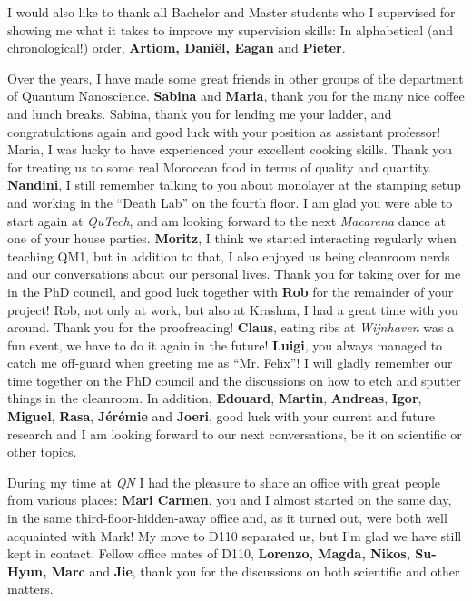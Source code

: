 I would also like to thank all Bachelor and Master students who I supervised for showing me what it takes to improve my supervision skills:
%
In alphabetical (and chronological!) order, \textbf{Artiom, Daniël, Eagan} and \textbf{Pieter}.

Over the years, I have made some great friends in other groups of the department of Quantum Nanoscience.
%
\textbf{Sabina} and \textbf{Maria}, thank you for the many nice coffee and lunch breaks.
%
Sabina, thank you for lending me your ladder, and congratulations again and good luck with your position as assistant professor!
%
Maria, I was lucky to have experienced your excellent cooking skills. 
%
Thank you for treating us to some real Moroccan food in terms of quality and quantity.
%
\textbf{Nandini}, I still remember talking to you about monolayer  at the stamping setup and working in the \enquote{Death Lab} on the fourth floor.
%
I am glad you were able to start again at \textit{QuTech}, and am looking forward to the next \textit{Macarena} dance at one of your house parties.
%
\textbf{Moritz}, I think we started interacting regularly when teaching QM1, but in addition to that, I also enjoyed us being cleanroom nerds and our conversations about our personal lives.
%
Thank you for taking over for me in the PhD council, and good luck together with \textbf{Rob} for the remainder of your project!
%
Rob, not only at work, but also at Krashna, I had a great time with you around.
%
Thank you for the proofreading!
%
\textbf{Claus}, eating ribs at \textit{Wijnhaven} was a fun event, we have to do it again in the future!
%
\textbf{Luigi}, you always managed to catch me off-guard when greeting me as \enquote{Mr. Felix}!
%
I will gladly remember our time together on the PhD council and the discussions on how to etch and sputter things in the cleanroom.
%
In addition, \textbf{Edouard}, \textbf{Martin}, \textbf{Andreas}, \textbf{Igor}, \textbf{Miguel}, \textbf{Rasa}, \textbf{Jérémie} and \textbf{Joeri}, good luck with your current and future research and I am looking forward to our next conversations, be it on scientific or other topics.

During my time at \textit{QN} I had the pleasure to share an office with great people from various places:
%
\textbf{Mari Carmen}, you and I almost started on the same day, in the same third-floor-hidden-away office and, as it turned out, were both well acquainted with Mark!
%
My move to D110 separated us, but I'm glad we have still kept in contact.
%
Fellow office mates of D110, \textbf{Lorenzo, Magda, Nikos, Su-Hyun, Marc} and \textbf{Jie}, thank you for the discussions on both scientific and other matters.


